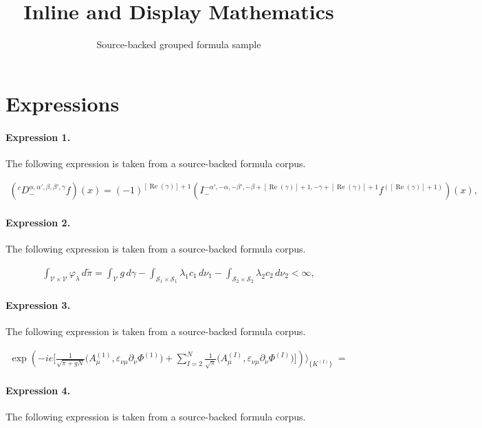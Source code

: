 \documentclass[11pt]{article}
\title{Inline and Display Mathematics}
\author{Source-backed grouped formula sample}
\date{}
\begin{document}
\maketitle
\section{Expressions}
\paragraph{Expression 1.} The following expression is taken from a source-backed formula corpus.

\begin{align*}\left({}^{c}D_{-}^{\alpha,\alpha',\beta,\beta',\gamma}f\right)(x)=\left(-1\right)^{[\operatorname{Re}(\gamma)]+1}\left(I_{-}^{-\alpha',-\alpha,-\beta',-\beta+[\operatorname{Re}(\gamma)]+1,-\gamma+[\operatorname{Re}(\gamma)]+1}f^{({[\operatorname{Re}(\gamma)]+1})}\right)(x),\end{align*}

\paragraph{Expression 2.} The following expression is taken from a source-backed formula corpus.

\begin{align*}\int_{\mathcal{V} \times \mathcal{V} } \varphi_\lambda \, d \widetilde{\pi} = \int_{\mathcal{V}} g \, d \gamma - \int_{\mathcal{S}_{1} \times \mathcal{S}_{1} } \lambda_1 c_{1} \, d \nu_{1}-\int_{\mathcal{S}_{2} \times \mathcal{S}_{2} } \lambda_2 c_{2} \, d \nu_{2} < \infty,\end{align*}

\paragraph{Expression 3.} The following expression is taken from a source-backed formula corpus.

\begin{align*}\exp \left( - i e \Bigg[ \frac{1}{\sqrt{\pi\!+\!gN}}\Big( A^{(1)}_\mu, \varepsilon_{\nu \mu} \partial_\nu \Phi^{(1)} \Big) +\sum_{I=2}^N \frac{1}{\sqrt{\pi}}\Big( A^{(I)}_\mu, \varepsilon_{\nu \mu} \partial_\nu \Phi^{(I)} \Big) \Bigg]\right) \Bigg\rangle_{\{K^{(I)}\}} \; =\end{align*}

\paragraph{Expression 4.} The following expression is taken from a source-backed formula corpus.
\end{document}
